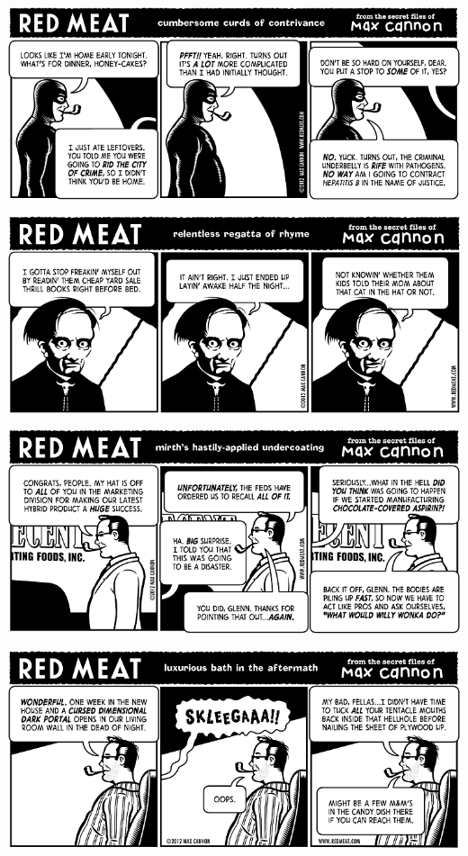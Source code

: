\documentclass[a4paper,twoside,11pt]{article}
\begin{document}
\includegraphics[width=\textwidth]{redmeat_2012-03-06.png}



\includegraphics[width=\textwidth]{redmeat_2012-03-13.png}



\includegraphics[width=\textwidth]{redmeat_2012-03-20.png}



\includegraphics[width=\textwidth]{redmeat_2012-03-27.png}
\end{document}
